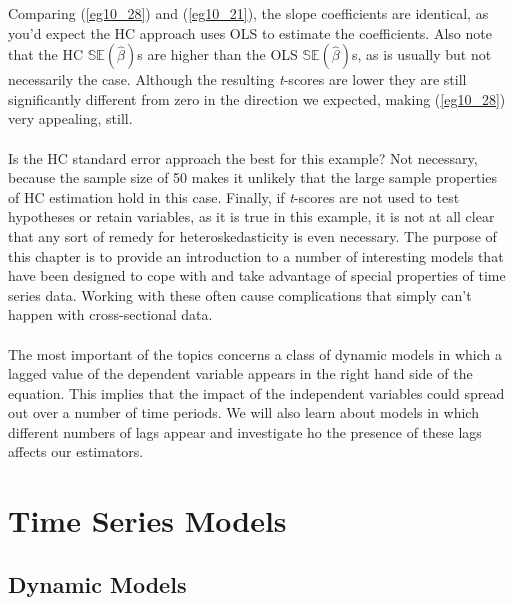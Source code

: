 \documentclass[11pt]{article}
\begin{document}
Comparing (\ref{eg10_28}) and (\ref{eg10_21}), the slope coefficients are identical, as you'd expect the HC approach uses OLS to estimate the coefficients. Also note that the HC $\mathbb{SE}(\hat{\beta})$s are higher than the OLS $\mathbb{SE}(\hat{\beta})$s, as is usually but not necessarily the case. Although the resulting \textit{t}-scores are lower they are still significantly different from zero in the direction we expected, making (\ref{eg10_28}) very appealing, still.\\ \\
Is the HC standard error approach the best for this example? Not necessary, because the sample size of 50 makes it unlikely that the large sample properties of HC estimation hold in this case. Finally, if \textit{t}-scores are not used to test hypotheses or retain variables, as it is true in this example, it is not at all clear that any sort of remedy for heteroskedasticity is even necessary.
The purpose of this chapter is to provide an introduction to a number of interesting models that have been designed to cope with and take advantage of special properties of time series data. Working with these often cause complications that simply can't happen with cross-sectional data.\\ \\
The most important of the topics concerns a class of dynamic models in which a lagged value of the dependent variable appears in the right hand side of the equation. This implies that the impact of the independent variables could spread out over a number of time periods. We will also learn about models in which different numbers of lags appear and investigate ho the presence of these lags affects our estimators.
\clearpage
\section{Time Series Models}
\subsection{Dynamic Models}
\end{document}
